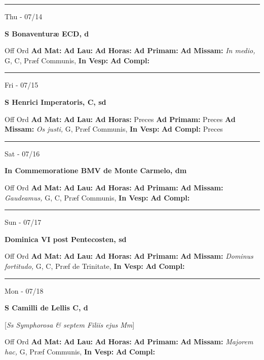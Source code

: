 \documentclass[letterpaper, 10pt]{article}
\begin{document}
\hrule
\begin{center}
Thu - 07/14
\end{center}\textbf{ \large S Bonaventuræ ECD, \textnormal{\normalsize d}}
\begin{justify}
Off Ord
\textbf{Ad Mat: }
\textbf{Ad Lau: }
\textbf{Ad Horas: }
\textbf{Ad Primam: }
\textbf{Ad Missam:} \textit{In medio, } G, C, Præf Communis, 
\textbf{In Vesp: }
\textbf{Ad Compl: }\end{justify}



\hrule
\begin{center}
Fri - 07/15
\end{center}\textbf{ \large S Henrici Imperatoris, C, \textnormal{\normalsize sd}}
\begin{justify}
Off Ord
\textbf{Ad Mat: }
\textbf{Ad Lau: }
\textbf{Ad Horas: }Preces
\textbf{Ad Primam: }Preces
\textbf{Ad Missam:} \textit{Os justi, } G, Præf Communis, 
\textbf{In Vesp: }
\textbf{Ad Compl: }Preces\end{justify}



\hrule
\begin{center}
Sat - 07/16
\end{center}\textbf{ \large In Commemoratione BMV de Monte Carmelo, \textnormal{\normalsize dm}}
\begin{justify}
Off Ord
\textbf{Ad Mat: }
\textbf{Ad Lau: }
\textbf{Ad Horas: }
\textbf{Ad Primam: }
\textbf{Ad Missam:} \textit{Gaudeamus, } G, C, Præf Communis, 
\textbf{In Vesp: }
\textbf{Ad Compl: }\end{justify}



\hrule
\begin{center}
Sun - 07/17
\end{center}\textbf{ \large Dominica VI post Pentecosten, \textnormal{\normalsize sd}}
\begin{justify}
Off Ord
\textbf{Ad Mat: }
\textbf{Ad Lau: }
\textbf{Ad Horas: }
\textbf{Ad Primam: }
\textbf{Ad Missam:} \textit{Dominus fortitudo, } G, C, Præf de Trinitate, 
\textbf{In Vesp: }
\textbf{Ad Compl: }\end{justify}



\hrule
\begin{center}
Mon - 07/18
\end{center}\textbf{ \large S Camilli de Lellis C, \textnormal{\normalsize d}}

[\textit{Ss Symphorosa \& septem Filiis ejus Mm}]
\begin{justify}
Off Ord
\textbf{Ad Mat: }
\textbf{Ad Lau: }
\textbf{Ad Horas: }
\textbf{Ad Primam: }
\textbf{Ad Missam:} \textit{Majorem hac, } G, Præf Communis, 
\textbf{In Vesp: }
\textbf{Ad Compl: }\end{justify}
\end{document}

